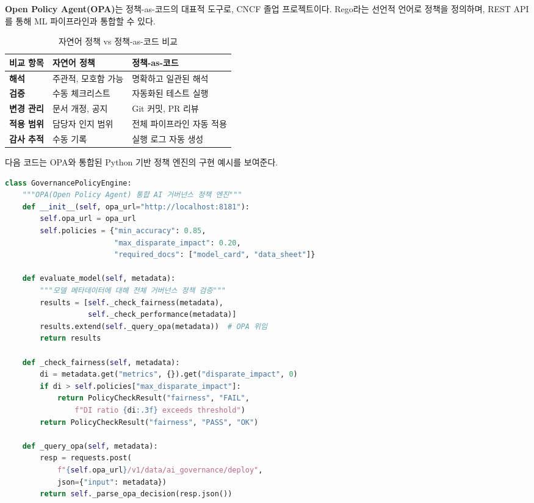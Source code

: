 \textbf{Open Policy Agent(OPA)}는 정책-as-코드의 대표적 도구로, CNCF 졸업 프로젝트이다. Rego라는 선언적 언어로 정책을 정의하며, REST API를 통해 ML 파이프라인과 통합할 수 있다.

\begin{table}[htbp]
\centering
\caption{자연어 정책 vs 정책-as-코드 비교}
\label{tab:14_policy_comparison}
\begin{tabularx}{\textwidth}{lXX}
\toprule
\textbf{비교 항목} & \textbf{자연어 정책} & \textbf{정책-as-코드} \\
\midrule
\textbf{해석} & 주관적, 모호함 가능 & 명확하고 일관된 해석 \\
\textbf{검증} & 수동 체크리스트 & 자동화된 테스트 실행 \\
\textbf{변경 관리} & 문서 개정, 공지 & Git 커밋, PR 리뷰 \\
\textbf{적용 범위} & 담당자 인지 범위 & 전체 파이프라인 자동 적용 \\
\textbf{감사 추적} & 수동 기록 & 실행 로그 자동 생성 \\
\bottomrule
\end{tabularx}
\end{table}

다음 코드는 OPA와 통합된 Python 기반 정책 엔진의 구현 예시를 보여준다.

\begin{lstlisting}[language=Python, caption={OPA 통합 정책-as-코드 엔진 구현}, label={lst:policy_as_code}]
class GovernancePolicyEngine:
    """OPA(Open Policy Agent) 통합 AI 거버넌스 정책 엔진"""
    def __init__(self, opa_url="http://localhost:8181"):
        self.opa_url = opa_url
        self.policies = {"min_accuracy": 0.85,
                         "max_disparate_impact": 0.20,
                         "required_docs": ["model_card", "data_sheet"]}

    def evaluate_model(self, metadata):
        """모델 메타데이터에 대해 전체 거버넌스 정책 검증"""
        results = [self._check_fairness(metadata),
                   self._check_performance(metadata)]
        results.extend(self._query_opa(metadata))  # OPA 위임
        return results

    def _check_fairness(self, metadata):
        di = metadata.get("metrics", {}).get("disparate_impact", 0)
        if di > self.policies["max_disparate_impact"]:
            return PolicyCheckResult("fairness", "FAIL",
                f"DI ratio {di:.3f} exceeds threshold")
        return PolicyCheckResult("fairness", "PASS", "OK")

    def _query_opa(self, metadata):
        resp = requests.post(
            f"{self.opa_url}/v1/data/ai_governance/deploy",
            json={"input": metadata})
        return self._parse_opa_decision(resp.json())
\end{lstlisting}


